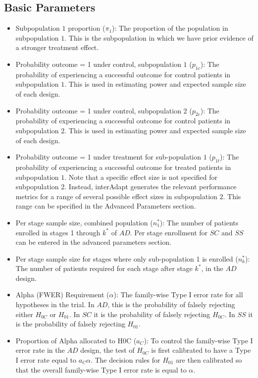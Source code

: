 \documentclass{article}
\newcommand{\interAdapt}{\textsf{interAdapt }}
\begin{document}
\subsection*{Basic Parameters}
\begin{itemize} 

\item Subpopulation $1$ proportion ($π_1$): The proportion of the population in subpopulation $1$. This is the subpopulation in which we have prior evidence of a stronger treatment effect. 

\item Probability outcome = 1 under control, subpopulation $1$ ($p_{1c}$): The probability of experiencing a successful outcome for control patients in subpopulation $1$. This is used in estimating power and expected sample size of each design.

\item Probability outcome = 1 under control, subpopulation $2$ ($p_{2c}$): The probability of experiencing a successful outcome for control patients in subpopulation $2$. This is used in estimating power and expected sample size of each design.

\item Probability outcome = 1 under treatment for sub-population $1$ ($p_{1t}$): The probability of experiencing a successful outcome for treated patients in subpopulation $1$. Note that a specific effect size is not specified for subpopulation $2$. Instead, \interAdapt generates the relevant performance metrics for a range of several possible effect sizes in subpopulation $2$. This range can be specified in the Advanced Parameters section.%

\item Per stage sample size, combined population ($n_1^*$): The number of patients enrolled in stages 1 through $k^*$ of $AD$. Per stage enrollment for $SC$ and $SS$ can be entered in the advanced parameters section.


\item Per stage sample size for stages where only sub-population 1 is enrolled ($n_k^*$): The number of patients required for each stage after stage $k^*$, in the $AD$ design.

\item Alpha (FWER) Requirement ($α$): The family-wise Type I error rate for all hypotheses in the trial. In $AD$, this is the probability of falsely rejecting either $H_{0C}$ or $H_{01}$. In $SC$ it is the probability of falsely rejecting $H_{0C}$. In $SS$ it is the probability of falsely rejecting $H_{01}$.

\item Proportion of Alpha allocated to H0C ($a_C$): To control the family-wise Type I error rate in the $AD$ design, the test of $H_{0C}$ is first calibrated to have a Type I error rate equal to $a_Cα$. The decision rules for $H_{01}$ are then calibrated so that the overall family-wise Type I error rate is equal to $α$.


\end{itemize}
\end{document}
